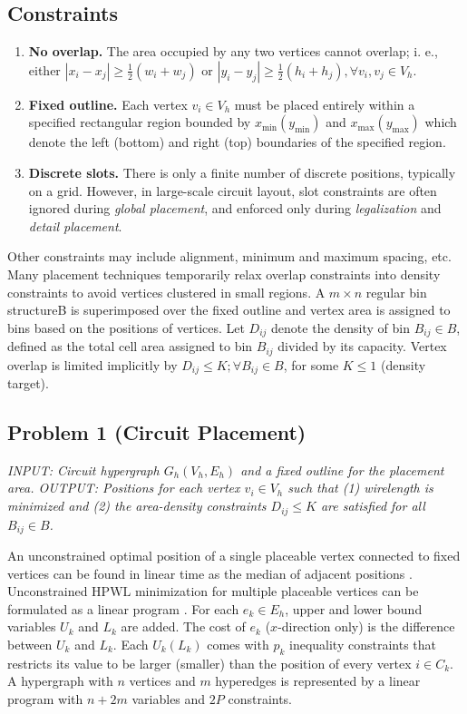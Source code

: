 \documentclass[natbib]{svcyclop}
\begin{document}
\subsection{Constraints}
\begin{enumerate}
\item \textbf{No overlap.} The area occupied by any two vertices cannot
overlap; i. e., either $|x_i-x_j|\ge \frac12(w_i + w_j)$ or
$|y_i-y_j|\ge \frac12(h_i + h_j), \forall v_i,v_j\in V_h$.
\item \textbf{Fixed outline.} Each vertex $v_i\in V_h$ must be placed entirely
within a specified rectangular region bounded by
$x_{\textrm{min}}(y_\textrm{min})$ and $x_{\textrm{max}}(y_\textrm{max})$
 which denote the left (bottom)
and right (top) boundaries of the specified region.
\item \textbf{Discrete slots.} There is only a finite number of discrete
positions, typically on a grid. However, in large-scale
circuit layout, slot constraints are often ignored during
\emph{global placement}, and enforced only during \emph{legalization}
and \emph{detail placement}.
\end{enumerate}

Other constraints may include alignment, minimum and
maximum spacing, etc. Many placement techniques temporarily
relax overlap constraints into density constraints
to avoid vertices clustered in small regions. A $m\times n$ regular
bin structure$ $B is superimposed over the fixed outline
and vertex area is assigned to bins based on the positions
of vertices. Let $D_{ij}$ denote the density of bin $B_{ij}\in B$, defined
as the total cell area assigned to bin $B_{ij}$ divided by
its capacity. Vertex overlap is limited implicitly by $D_{ij}\le
K;\forall B_{ij}\in B$, for some $K \le 1$ (density target).

\subsection{Problem 1 (Circuit Placement)}
{\itshape
\textsc{INPUT}: Circuit hypergraph $G_h(V_h,E_h)$ and a fixed outline
for the placement area.
\textsc{OUTPUT}: Positions for each vertex $v_i\in V_h$ such that
(1) wirelength is minimized and (2) the area-density constraints
$D_{ij}\le K$ are satisfied for all $B_{i j}\in B$.}

\KeyRes

An unconstrained optimal position of a single placeable
vertex connected to fixed vertices can be found in linear
time as the median of adjacent positions \cite{KenVor06}. Unconstrained
$\mathrm{HPWL}$ minimization for multiple placeable vertices
can be formulated as a linear program \cite{KenMar02,RedCho06}. For each
$e_k \in  E_h$, upper and lower bound variables $U_k$ and $L_k$ are
added. The cost of $e_k$ ($x$-direction only) is the difference
between $U_k$ and $L_k$. Each $U_k(L_k)$ comes with $p_k$ inequality
constraints that restricts its value to be larger (smaller)
than the position of every vertex $i\in C_k$. A hypergraph
with $n$ vertices and $m$ hyperedges is represented by a linear
program with $n + 2m$ variables and $2P$ constraints.
\end{document}
